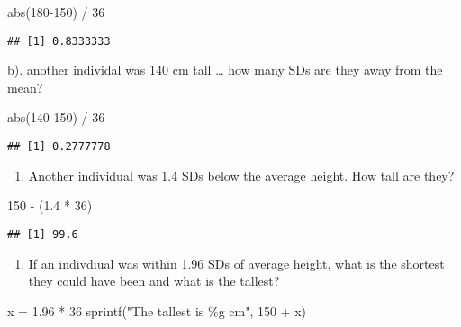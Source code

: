 \documentclass[
]{article}
\newenvironment{Shaded}{\begin{snugshade}}{\end{snugshade}}
\newcommand{\DecValTok}[1]{\textcolor[rgb]{0.00,0.00,0.81}{#1}}
\newcommand{\FloatTok}[1]{\textcolor[rgb]{0.00,0.00,0.81}{#1}}
\newcommand{\FunctionTok}[1]{\textcolor[rgb]{0.00,0.00,0.00}{#1}}
\newcommand{\NormalTok}[1]{#1}
\newcommand{\OtherTok}[1]{\textcolor[rgb]{0.56,0.35,0.01}{#1}}
\newcommand{\SpecialCharTok}[1]{\textcolor[rgb]{0.00,0.00,0.00}{#1}}
\newcommand{\StringTok}[1]{\textcolor[rgb]{0.31,0.60,0.02}{#1}}
\providecommand{\tightlist}{%
  \setlength{\itemsep}{0pt}\setlength{\parskip}{0pt}}
\begin{document}
\begin{Shaded}
\begin{Highlighting}[]
\FunctionTok{abs}\NormalTok{(}\DecValTok{180{-}150}\NormalTok{) }\SpecialCharTok{/} \DecValTok{36}
\end{Highlighting}
\end{Shaded}

\begin{verbatim}
## [1] 0.8333333
\end{verbatim}

b). another individal was 140 cm tall \ldots{} how many SDs are they
away from the mean?

\begin{Shaded}
\begin{Highlighting}[]
\FunctionTok{abs}\NormalTok{(}\DecValTok{140{-}150}\NormalTok{) }\SpecialCharTok{/} \DecValTok{36}
\end{Highlighting}
\end{Shaded}

\begin{verbatim}
## [1] 0.2777778
\end{verbatim}

\begin{enumerate}
\def\labelenumi{\alph{enumi})}
\setcounter{enumi}{2}
\tightlist
\item
  Another individual was 1.4 SDs below the average height. How tall are
  they?
\end{enumerate}

\begin{Shaded}
\begin{Highlighting}[]
\DecValTok{150} \SpecialCharTok{{-}}\NormalTok{ (}\FloatTok{1.4} \SpecialCharTok{*} \DecValTok{36}\NormalTok{)}
\end{Highlighting}
\end{Shaded}

\begin{verbatim}
## [1] 99.6
\end{verbatim}

\begin{enumerate}
\def\labelenumi{\alph{enumi})}
\setcounter{enumi}{3}
\tightlist
\item
  If an indivdiual was within 1.96 SDs of average height, what is the
  shortest they could have been and what is the tallest?
\end{enumerate}

\begin{Shaded}
\begin{Highlighting}[]
\NormalTok{x }\OtherTok{=} \FloatTok{1.96} \SpecialCharTok{*} \DecValTok{36}
\FunctionTok{sprintf}\NormalTok{(}\StringTok{"The tallest is \%g cm"}\NormalTok{, }\DecValTok{150} \SpecialCharTok{+}\NormalTok{ x)}
\end{Highlighting}
\end{Shaded}
\end{document}
